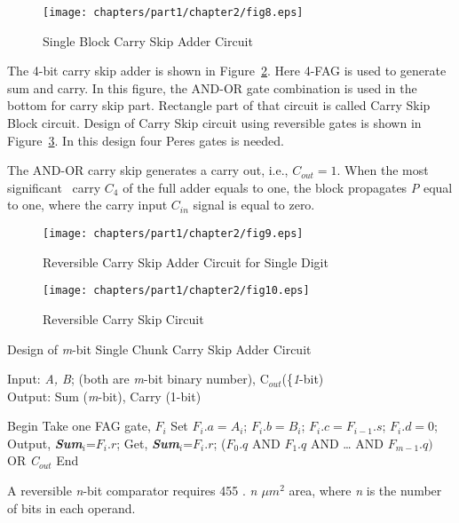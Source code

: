 \begin{figure}[!tbh]
\centering
\texttt{[image: chapters/part1/chapter2/fig8.eps]}
\caption{Single Block Carry Skip Adder Circuit}
\label{fig:p1_c2_fig8}
\end{figure}

The 4-bit carry skip adder is shown in Figure~\ref{fig:p1_c2_fig9}. Here 4-FAG is used to generate sum and carry. In this figure, the AND-OR gate combination is used in the bottom for carry skip part. Rectangle part of that circuit is called Carry Skip Block circuit. Design of Carry Skip circuit using reversible gates is shown in Figure~\ref{fig:p1_c2_fig10}. In this design four Peres gates is needed.

The AND-OR carry skip generates a carry out, i.e., $C_{out}=1$. When the most significant~ carry $C_4$
of the full adder equals to one, the block propagates \textit{P} equal to one, where the carry input
$C_{in}$ signal is equal to zero.

\begin{figure}[!tbh]
\centering
\texttt{[image: chapters/part1/chapter2/fig9.eps]}
\caption{Reversible Carry Skip Adder Circuit for Single Digit}
\label{fig:p1_c2_fig9}
\end{figure}



\begin{figure}[!tbh]
\centering
\texttt{[image: chapters/part1/chapter2/fig10.eps]}
\caption{Reversible Carry Skip Circuit}
\label{fig:p1_c2_fig10}
\end{figure}
\begin{algorithm}[!h]
\caption{Design of {\it m}-bit Single Chunk Carry Skip Adder Circuit}
\label{alg:part1_c2_alg3}
Input: { {\it A, B}; (both are {\it m}-bit binary number), C${}_{out}$(\{\it1}-bit)\\
Output: { { Sum ({\it m}-bit), Carry (1-bit)}}
\begin{algorithmic}[1]

\STATE Begin
\STATE Take one FAG gate, $F{}_{i}$
\STATE Set $F{}_{i}.a=A{}_{i}$; $F{}_{i}.b=B{}_{i}$; $F{}_{i}.c=F{}_{i-1}.s$; $F{}_{i}.d=0$;
\STATE Output, {\bf {\it Sum${}_{i}$}}=$F{}_{i}.r$;
\STATE Get, {\bf {\it Sum${}_{i}$}}=$F{}_{i}.r$;
\ENDFOR
{}($F{}_{0}.q$ {AND} $F{}_{1}.q$ {AND }{\dots} {AND} $F{}_{m-1}.q)${ OR {\it C${}_{out}$}}
\STATE End
\end{algorithmic}
\end{algorithm}
\begin{property}\textnormal{
A reversible {\it n}-bit comparator requires 455 ${.}$ {\it n $\mu m{}^{2}$} area, where {\it n} is the number of bits in each operand.}
\end{property}

